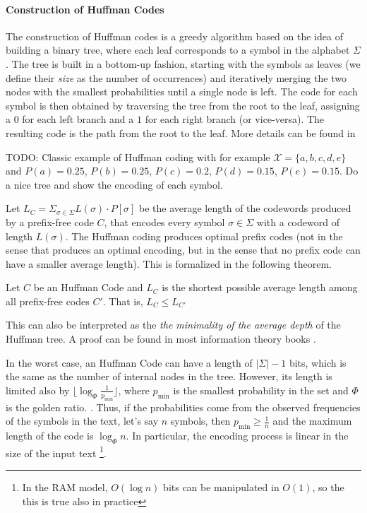 \paragraph*{Construction of Huffman Codes} The construction of Huffman codes is a greedy algorithm based on the idea of building a binary tree, where each leaf corresponds to a symbol in the alphabet $\Sigma$. The tree is built in a bottom-up fashion, starting with the symbols as leaves (we define their \emph{size} as the number of occurrences) and iteratively merging the two nodes with the smallest probabilities until a single node is left. The code for each symbol is then obtained by traversing the tree from the root to the leaf, assigning a $0$ for each left branch and a $1$ for each right branch (or vice-versa). The resulting code is the path from the root to the leaf. More details can be found in \cite{ferragina2023pearls,sayood2002lossless,han2002mathematics,ElementsofInformationTheory}

\begin{example}
    TODO: Classic example of Huffman coding with for example $\mathcal{X} = \{a,b,c,d,e\}$ and $P(a)= 0.25$, $P(b)=0.25$, $P(c)=0.2$, $P(d)=0.15$, $P(e)=0.15$. Do a nice tree and show the encoding of each symbol.
\end{example}

\noindent Let $L_C = \Sigma_{\sigma \in \Sigma} L(\sigma) \cdot P[\sigma]$ be the average length of the codewords produced by a prefix-free code $C$, that encodes every symbol $\sigma \in \Sigma$ with a codeword of length $L(\sigma)$. The Huffman coding produces optimal prefix codes (not in the sense that produces an optimal encoding, but in the sense that no prefix code can have a smaller average length). This is formalized in the following theorem.

\begin{theorem} \label{thm:huffman_optimality}
    Let $C$ be an Huffman Code and $L_C$ is the shortest possible average length among all prefix-free codes $C'$. That is, $L_C \leq L_{C'}$
\end{theorem}

\noindent This can also be interpreted as the \emph{the minimality of the average depth} of the Huffman tree. A proof can be found in most information theory books \cite{ferragina2023pearls,sayood2002lossless,han2002mathematics,ElementsofInformationTheory}.

\noindent In the worst case, an Huffman Code can have a length of $|\Sigma|-1$ bits, which is the same as the number of internal nodes in the tree. However, its length is limited also by $\lfloor \log_\varPhi \frac{1}{p_{\min}} \rfloor$, where $p_{\min}$ is the smallest probability in the set and $\varPhi$ is the golden ratio. \cite{navarro2016compact}. Thus, if the probabilities come from the observed frequencies of the symbols in the text, let's say $n$ symbols, then $p_{\min} \geq \frac{1}{n}$ and the maximum length of the code is $\log_\varPhi n $. In particular, the encoding process is linear in the size of the input text \footnote{In the RAM model, $O(\log n)$ bits can be manipulated in $O(1)$, so the this is true also in practice}.


